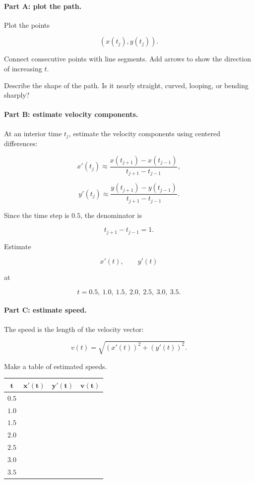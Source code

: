 \paragraph{Part A: plot the path.}
Plot the points

\[
(x(t_j),y(t_j)).
\]

Connect consecutive points with line segments.  Add arrows to show the direction of
increasing \(t\).

Describe the shape of the path.  Is it nearly straight, curved, looping, or bending sharply?

\paragraph{Part B: estimate velocity components.}
At an interior time \(t_j\), estimate the velocity components using centered differences:

\[
\boxed{
x'(t_j)\approx
\frac{x(t_{j+1})-x(t_{j-1})}{t_{j+1}-t_{j-1}},
}
\]

\[
\boxed{
y'(t_j)\approx
\frac{y(t_{j+1})-y(t_{j-1})}{t_{j+1}-t_{j-1}}.
}
\]

Since the time step is \(0.5\), the denominator is

\[
t_{j+1}-t_{j-1}=1.
\]

Estimate

\[
x'(t),\qquad y'(t)
\]

at

\[
t=0.5,\ 1.0,\ 1.5,\ 2.0,\ 2.5,\ 3.0,\ 3.5.
\]

\paragraph{Part C: estimate speed.}
The speed is the length of the velocity vector:

\[
\boxed{
v(t)=\sqrt{(x'(t))^2+(y'(t))^2}.
}
\]

Make a table of estimated speeds.

\begin{center}
\renewcommand{\arraystretch}{1.35}
\begin{tabular}{c|c|c|c}
\(\boldsymbol{t}\) &
\(\boldsymbol{x'(t)}\) &
\(\boldsymbol{y'(t)}\) &
\(\boldsymbol{v(t)}\) \\ \hline
\(0.5\) & & & \\
\(1.0\) & & & \\
\(1.5\) & & & \\
\(2.0\) & & & \\
\(2.5\) & & & \\
\(3.0\) & & & \\
\(3.5\) & & &
\end{tabular}
\end{center}

